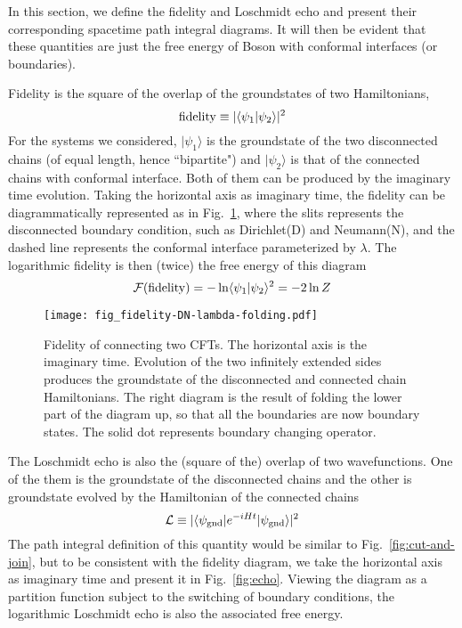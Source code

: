 
In this section, we define the fidelity and Loschmidt echo and present their corresponding spacetime path integral diagrams. It will then be evident that these quantities are just the free energy of Boson with conformal interfaces (or boundaries). 

Fidelity is the square of the overlap of the groundstates of two Hamiltonians, 
\begin{equation}
{\rm fidelity} \equiv |\langle \psi_1 |\psi_2  \rangle |^2 
\end{equation}
For the systems we considered, $|\psi_1 \rangle$ is the groundstate of the two disconnected chains (of equal length, hence ``bipartite") and $|\psi_2\rangle$ is that of the connected chains with conformal interface. Both of them can be produced by the imaginary time evolution. Taking the horizontal axis as imaginary time, the fidelity can be diagrammatically represented as in Fig.~\ref{fig:fidel}, where the slits represents the disconnected boundary condition, such as Dirichlet(D) and Neumann(N), and the dashed line represents the conformal interface parameterized by $\lambda$. The logarithmic fidelity is then (twice) the free energy of this diagram
\begin{equation}
\mathcal{F}( {\rm fidelity} )  = - \ln \langle \psi_1 |\psi_2 \rangle^2 = - 2 \ln Z
\end{equation}

\begin{figure}[h]
\texttt{[image: fig\_fidelity-DN-lambda-folding.pdf]}
\caption{Fidelity of connecting two CFTs. The horizontal axis is the imaginary time. Evolution of the two infinitely extended sides produces the groundstate of the disconnected and connected chain Hamiltonians. The right diagram is the result of folding the lower part of the diagram up, so that all the boundaries are now boundary states. The solid dot represents boundary changing operator.}
\label{fig:fidel}
\end{figure}

The Loschmidt echo is also the (square of the) overlap of two wavefunctions. One of the them is the groundstate of the disconnected chains and the other is groundstate evolved by the Hamiltonian of the connected chains
\begin{equation}
\mathcal{L} \equiv |\langle \psi_{\rm gnd}  | e^{-i H t } | \psi_{\rm gnd} \rangle|^2
\end{equation}
The path integral definition of this quantity would be similar to Fig.~\ref{fig:cut-and-join}, but to be consistent with the fidelity diagram, we take the horizontal axis as imaginary time and present it in Fig.~\ref{fig:echo}. Viewing the diagram as a partition function subject to the switching of boundary conditions, the logarithmic Loschmidt echo is also the associated free energy.

